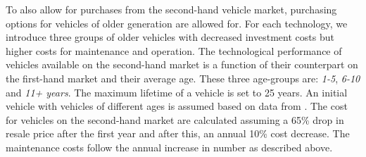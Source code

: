 \documentclass[preprint,review,11pt, authoryear]{elsarticle}
\begin{document}
            To also allow for purchases from the second-hand vehicle market, purchasing options for vehicles of older generation are allowed for. For each technology, we introduce three groups of older vehicles with decreased investment costs but higher costs for maintenance and operation. The technological performance of vehicles available on the second-hand market is a function of their counterpart on the first-hand market and their average age. These three age-groups are: \textit{1-5}, \textit{6-10} and \textit{11\deleted{ }+ years}. The maximum lifetime of a vehicle is set to 25 years. An initial vehicle with vehicles of different ages is assumed based on data from \citep{dgt2023}. The cost for vehicles on the second-hand market are calculated assuming a 65\% drop in resale price after the first year and after this, an annual 10\% cost decrease. The maintenance costs follow the annual increase in number as described above. 
            
\end{document}
